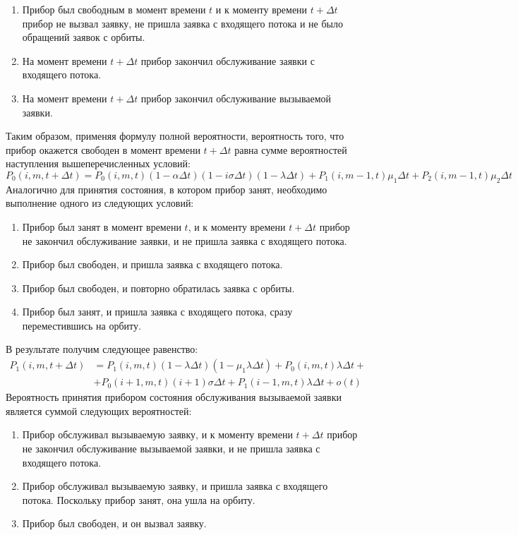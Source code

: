 \begin{enumerate}
	\item Прибор был свободным в момент времени $t$ и к моменту времени $t+\Delta t$  прибор не вызвал заявку, не пришла заявка с входящего потока и не было обращений заявок с орбиты.
	\item На момент времени $t+\Delta t$ прибор закончил обслуживание заявки с входящего потока.
	\item На момент времени $t+\Delta t$ прибор закончил обслуживание вызываемой заявки.
\end{enumerate}
Таким образом, применяя формулу полной вероятности, вероятность того, что прибор окажется свободен в момент времени $t+\Delta t$ равна сумме вероятностей наступления вышеперечисленных условий:
\begin{equation*}
	P_{0}(i,m,t+\Delta t)=P_{0}(i,m,t)(1-\alpha\Delta t)(1 - i\sigma\Delta t)(1-\lambda\Delta t)+P_{1}(i,m-1,t)\mu_{1}\Delta t + P_{2}(i,m-1,t)\mu_{2}\Delta t
\end{equation*}
Аналогично для принятия состояния, в котором прибор занят, необходимо выполнение одного из следующих условий:
\begin{enumerate}
	\item Прибор был занят в момент времени $t$,  и к моменту времени $t+\Delta t$ прибор не закончил обслуживание заявки, и не пришла заявка с входящего потока.
	\item Прибор был свободен, и пришла заявка с входящего потока.
	\item Прибор был свободен, и повторно обратилась заявка с орбиты.
	\item Прибор был занят, и пришла заявка с входящего потока, сразу переместившись на орбиту.
\end{enumerate}
В результате получим следующее равенство:
\begin{equation*}
	\begin{split}
			P_{1}(i,m,t+\Delta t)&=P_{1}(i,m,t)(1-\lambda\Delta t)(1-\mu_{1}\lambda\Delta t)+P_{0}(i,m,t)\lambda\Delta t +\\ &+ P_{0}(i+1,m,t)(i+1)\sigma\Delta t + P_{1}(i-1,m,t)\lambda\Delta t + o(t)
	\end{split}
\end{equation*}
Вероятность принятия прибором состояния обслуживания вызываемой заявки является суммой следующих вероятностей:
\begin{enumerate}
	\item Прибор обслуживал вызываемую заявку, и к моменту времени $t+\Delta t$ прибор не закончил обслуживание вызываемой заявки, и не пришла заявка с входящего потока.
	\item Прибор обслуживал вызываемую заявку, и пришла заявка с входящего потока. Поскольку прибор занят, она ушла на орбиту.
	\item Прибор был свободен, и он вызвал заявку.
\end{enumerate}
